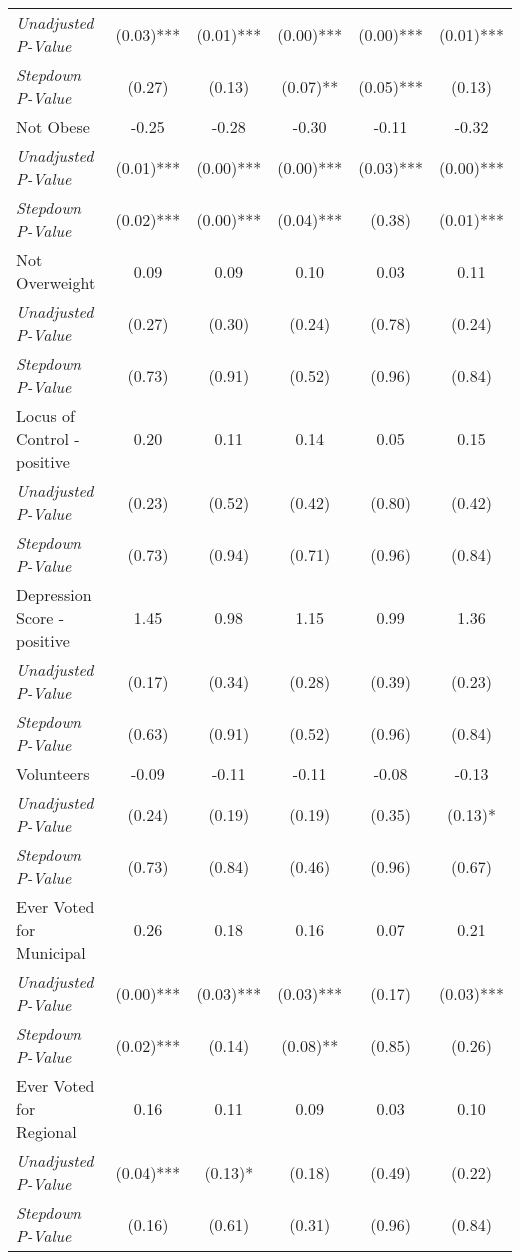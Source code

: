 \begin{tabular}{l c c c c c}
\quad \textit{Unadjusted P-Value} & (0.03)*** & (0.01)*** & (0.00)*** & (0.00)*** & (0.01)*** \\
\quad \textit{Stepdown P-Value} & (0.27) & (0.13) & (0.07)** & (0.05)*** & (0.13) \\
Not Obese & -0.25 & -0.28 & -0.30 & -0.11 & -0.32 \\
\quad \textit{Unadjusted P-Value} & (0.01)*** & (0.00)*** & (0.00)*** & (0.03)*** & (0.00)*** \\
\quad \textit{Stepdown P-Value} & (0.02)*** & (0.00)*** & (0.04)*** & (0.38) & (0.01)*** \\
Not Overweight & 0.09 & 0.09 & 0.10 & 0.03 & 0.11 \\
\quad \textit{Unadjusted P-Value} & (0.27) & (0.30) & (0.24) & (0.78) & (0.24) \\
\quad \textit{Stepdown P-Value} & (0.73) & (0.91) & (0.52) & (0.96) & (0.84) \\
Locus of Control - positive & 0.20 & 0.11 & 0.14 & 0.05 & 0.15 \\
\quad \textit{Unadjusted P-Value} & (0.23) & (0.52) & (0.42) & (0.80) & (0.42) \\
\quad \textit{Stepdown P-Value} & (0.73) & (0.94) & (0.71) & (0.96) & (0.84) \\
Depression Score - positive & 1.45 & 0.98 & 1.15 & 0.99 & 1.36 \\
\quad \textit{Unadjusted P-Value} & (0.17) & (0.34) & (0.28) & (0.39) & (0.23) \\
\quad \textit{Stepdown P-Value} & (0.63) & (0.91) & (0.52) & (0.96) & (0.84) \\
Volunteers & -0.09 & -0.11 & -0.11 & -0.08 & -0.13 \\
\quad \textit{Unadjusted P-Value} & (0.24) & (0.19) & (0.19) & (0.35) & (0.13)* \\
\quad \textit{Stepdown P-Value} & (0.73) & (0.84) & (0.46) & (0.96) & (0.67) \\
Ever Voted for Municipal & 0.26 & 0.18 & 0.16 & 0.07 & 0.21 \\
\quad \textit{Unadjusted P-Value} & (0.00)*** & (0.03)*** & (0.03)*** & (0.17) & (0.03)*** \\
\quad \textit{Stepdown P-Value} & (0.02)*** & (0.14) & (0.08)** & (0.85) & (0.26) \\
Ever Voted for Regional & 0.16 & 0.11 & 0.09 & 0.03 & 0.10 \\
\quad \textit{Unadjusted P-Value} & (0.04)*** & (0.13)* & (0.18) & (0.49) & (0.22) \\
\quad \textit{Stepdown P-Value} & (0.16) & (0.61) & (0.31) & (0.96) & (0.84) \\

\end{tabular}
